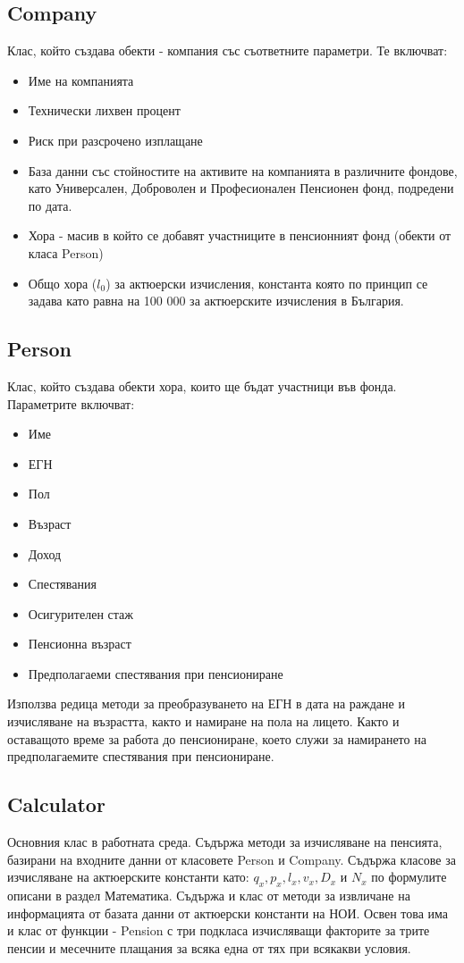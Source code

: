 \documentclass[a4paper,12pt]{article}
\begin{document}
\subsection{Company}
Клас, който създава обекти - компания със съответните параметри. Те включват:
\begin{itemize}
        \item Име на компанията
        \item Технически лихвен процент
        \item Риск при разсрочено изплащане
        \item База данни със стойностите на активите на компанията в различните фондове, като Универсален, Доброволен и Професионален Пенсионен фонд, подредени по дата.
        \item Хора - масив в който се добавят участниците в пенсионният фонд (обекти от класа Person)
        \item Общо хора ($l_0$) за актюерски изчисления, константа която по принцип се задава като равна на 100 000 за актюерските изчисления в България.
\end{itemize}

\subsection{Person}
Клас, който създава обекти хора, които ще бъдат участници във фонда. Параметрите включват:
\begin{itemize}
        \item Име
        \item ЕГН
        \item Пол
        \item Възраст
        \item Доход
        \item Спестявания
        \item Осигурителен стаж
        \item Пенсионна възраст
        \item Предполагаеми спестявания при пенсиониране
\end{itemize}
Използва редица методи за преобразуването на ЕГН в дата на раждане и изчисляване на възрастта, както и намиране на пола на лицето. Както и оставащото време за работа до пенсиониране, което служи за намирането на предполагаемите спестявания при пенсиониране.
\subsection{Calculator}
Основния клас в работната среда. Съдържа методи за изчисляване на пенсията, базирани на входните данни от класовете Person и Company.
\newline
Съдържа класове за изчисляване на актюерските константи като: $q_x, p_x, l_x, v_x, D_x$ и $N_x$ по формулите описани в раздел Математика. Съдържа и клас от методи за извличане на информацията от базата данни от актюерски константи на НОИ. Освен това има и клас от функции - Pension с три подкласа изчисляващи факторите за трите пенсии и месечните плащания за всяка една от тях при всякакви условия.
\end{document}

